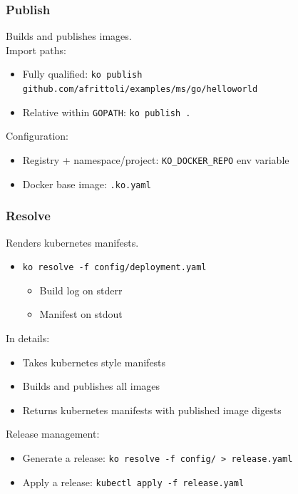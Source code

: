 \documentclass[aspectratio=169,11pt,hyperref={colorlinks=true}]{beamer}
\begin{document}
\begin{2columnsframe}
\begin{grayframe}
  \frametitle{Publish}
  Builds and publishes images. \\
  \vspace{3ex}
  Import paths:
  \begin{itemize}
    \item Fully qualified: \texttt{ko publish github.com/afrittoli/examples/ms/go/helloworld}
    \item Relative within \texttt{GOPATH}: \texttt{ko publish .}
  \end{itemize}
  \vspace{3ex}
  Configuration:
  \begin{itemize}
    \item Registry + namespace/project: \texttt{KO\_DOCKER\_REPO} env variable
    \item Docker base image: \texttt{.ko.yaml}
  \end{itemize}
\end{grayframe}

\begin{grayframe}
  \frametitle{Resolve}
  Renders kubernetes manifests. \\
  \begin{itemize}
    \item  \texttt{ko resolve -f config/deployment.yaml}
    \begin{itemize}
      \item Build log on stderr
      \item Manifest on stdout
    \end{itemize}
  \end{itemize}
  \vspace{2ex}
  In details:
  \begin{itemize}
    \item Takes kubernetes style manifests
    \item Builds and publishes all images
    \item Returns kubernetes manifests with published image digests
  \end{itemize}
  \vspace{2ex}
  Release management:
  \begin{itemize}
    \item Generate a release: \texttt{ko resolve -f config/ > release.yaml}
    \item Apply a release: \texttt{kubectl apply -f release.yaml}
  \end{itemize}
\end{grayframe}


\end{2columnsframe}
\end{document}
